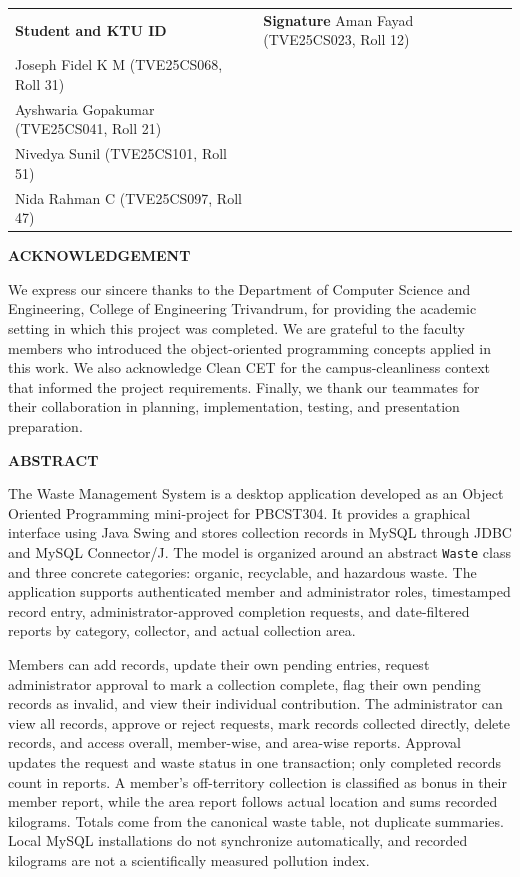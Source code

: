 \documentclass[12pt,a4paper]{report}
\begin{document}
\vspace{24pt}
\begin{longtable}{p{}p{}}
\textbf{Student and KTU ID} & \textbf{Signature}\endhead
Aman Fayad (TVE25CS023, Roll 12) & \\[24pt]
Joseph Fidel K M (TVE25CS068, Roll 31) & \\[24pt]
Ayshwaria Gopakumar (TVE25CS041, Roll 21) & \\[24pt]
Nivedya Sunil (TVE25CS101, Roll 51) & \\[24pt]
Nida Rahman C (TVE25CS097, Roll 47) & \\[24pt]
\end{longtable}

\newpage
\begin{center}\LARGE\textbf{ACKNOWLEDGEMENT}\end{center}
\vspace{18pt}
We express our sincere thanks to the Department of Computer Science and Engineering, College of Engineering Trivandrum, for providing the academic setting in which this project was completed. We are grateful to the faculty members who introduced the object-oriented programming concepts applied in this work. We also acknowledge Clean CET for the campus-cleanliness context that informed the project requirements. Finally, we thank our teammates for their collaboration in planning, implementation, testing, and presentation preparation.

\newpage
\begin{center}\LARGE\textbf{ABSTRACT}\end{center}
\vspace{12pt}
The Waste Management System is a desktop application developed as an Object Oriented Programming mini-project for PBCST304. It provides a graphical interface using Java Swing and stores collection records in MySQL through JDBC and MySQL Connector/J. The model is organized around an abstract \texttt{Waste} class and three concrete categories: organic, recyclable, and hazardous waste. The application supports authenticated member and administrator roles, timestamped record entry, administrator-approved completion requests, and date-filtered reports by category, collector, and actual collection area.

Members can add records, update their own pending entries, request administrator approval to mark a collection complete, flag their own pending records as invalid, and view their individual contribution. The administrator can view all records, approve or reject requests, mark records collected directly, delete records, and access overall, member-wise, and area-wise reports. Approval updates the request and waste status in one transaction; only completed records count in reports. A member's off-territory collection is classified as bonus in their member report, while the area report follows actual location and sums recorded kilograms. Totals come from the canonical waste table, not duplicate summaries. Local MySQL installations do not synchronize automatically, and recorded kilograms are not a scientifically measured pollution index.
\end{document}

